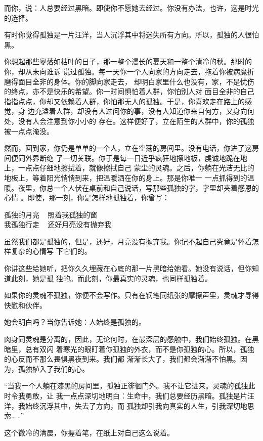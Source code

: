 \documentclass[12pt,a4paper]{article}
\begin{document}
		而你，说：人总要经过黑暗。即使你不愿她去经过。你没有办法，也许，这是时光的选择。

		有时你觉得孤独是一片汪洋，当人沉浮其中将迷失所有方向。所以，孤独的人很怕黑。

		你想起那些寥落如枯叶的日子，那一整个漫长的夏天和一整个清冷的秋。那时的你，却从未向谁诉
	说过孤独。每一天你一个人向家的方向走去，拖着你被病魔折磨得面目全非的身体。你的脚向家走去，
	却明白家里什么也没有，家，不是忧伤的终点，亦不是快乐的希望。你一时间惧怕着人群，你怕别人对
	面目全非的自己指指点点，你却又依赖着人群，你怕那无人的孤独。于是，你喜欢走在路上的感觉，身
	边充溢着人群，却没有人过问你的事，没有人知道你来自何方，又身向何处，没有人会注意到你小小的
	存在。这样便好了，立在陌生的人群中，你的孤独被一点点淹没。

		然而，回到家，你仍是单单的一个人，立在空荡的房间里。没有电话，你进了这房间便同外界断绝
	了一切关联。你于是每一日近乎疯狂地擦地板，虔诚地跪在地上，一点点仔细地擦拭着，就像擦拭自己
	蒙尘的灵魂。之后，你躺在光洁无比的地板上，等着阳光悄悄到来，把温暖洒在你的身上。那是你唯一
	一点抓得到的温暖。夜里，你总一个人伏在桌前和自己说话，写那些孤独的字，字里却夹着感恩的心情
	。即使，那一刻，你是怎样地孤独着，你曾写：

		\longpoem{}{}{}
		孤独的月亮 ~ 照着我孤独的窗 \\
		我孤独行走 ~ 还好月亮没有抛弃我
		\endlongpoem

		虽然我们都是孤独的，但是，还好，月亮没有抛弃我。你记不起自己究竟是怀着怎样复杂的心情写
	下它们的。

		你讲这些给她听，把你久久埋藏在心底的那一片黑暗给她看。她没有说话，但你知道此刻，她是孤
	独的。而此刻，你最真实的灵魂，也同样孤独着。

		如果你的灵魂不孤独，你便不会写作。只有在钢笔同纸张的摩擦声里，灵魂才寻得快慰和伙伴。

		她会明白吗？当你告诉她：人始终是孤独的。

		肉身同灵魂是分离的，因此，无论何时，在最深层的感触中，我们始终孤独。在黑暗里，总有双闪
	着寒光的眼盯着你孤独的外衣，而不是你孤独的心。所以，孤独的心反而不那么畏惧黑夜到来。我们都
	渐渐长大了，我们都会渐渐不怕黑。因为，孤独植入了我们的心。

		“当我一个人躺在漆黑的房间里，孤独正徘徊门外。我不让它进来。灵魂的孤独此时令我勇敢，让
	我一点点深切地明白：生命中，我们总要经历黑暗。孤独是片汪洋，我始终沉浮其中，失去了方向，而
	孤独却引我向真实的人生，引我深切地思索……”

		这个微冷的清晨，你握着笔，在纸上对自己这么说着。
\end{document}
